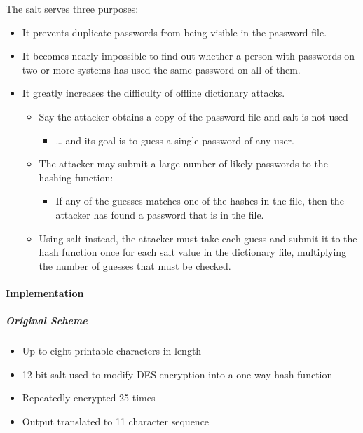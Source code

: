 \documentclass{article}
\begin{document}
        
         The salt serves three purposes:
            \begin{itemize}
                \item It prevents duplicate passwords from being visible in the password file.
                \item It becomes nearly impossible to find out whether a person with passwords on two or more systems has used the same password on all of them.
                \item It greatly increases the difficulty of offline dictionary attacks.
                \begin{itemize}
                    \item Say the attacker obtains a copy of the password file and salt is not used
                    \begin{itemize}
                        \item … and its goal is to guess a single password of any user.
                    \end{itemize}    
                    \item The attacker may submit a large number of likely passwords to the hashing function:
                        \begin{itemize}
                            \item If any of the guesses matches one of the hashes in the file, then the attacker has found a password that is in the file.
                        \end{itemize}
                    \item Using salt instead, the attacker must take each guess and submit it to the hash function once for each salt value in the dictionary file, multiplying the number of guesses that must be checked.

                \end{itemize}
            \end{itemize}

            \paragraph{Implementation}
                \subparagraph{Original Scheme}
                \begin{itemize}
                    \item Up to eight printable characters in length
                    \item 12-bit salt used to modify DES encryption into a one-way hash function
                    \item Repeatedly encrypted 25 times
                    \item Output translated to 11 character sequence
                \end{itemize}
\end{document}
